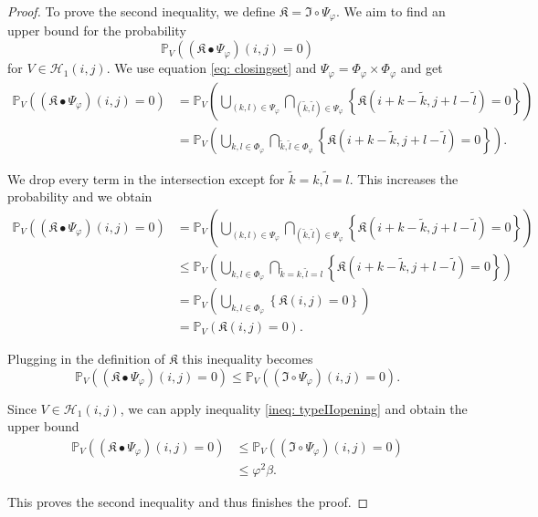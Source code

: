 \documentclass[a4paper,12pt]{article}
\theoremstyle{plain}
\theoremstyle{definition}
\begin{document}
\begin{proof}
	
	To prove the second inequality, we define $\mathfrak{K} = \mathfrak{I} \circ \Psi_\varphi$. We aim to find an upper bound for the probability
	\begin{equation*}
		\mathbb{P}_V\left( (\mathfrak{K} \bullet \Psi_\varphi)(i, j) = 0 \right)
	\end{equation*}
	for $V \in \mathcal{H}_1(i, j)$. We use equation \eqref{eq: closingset} and $\Psi_\varphi = \Phi_\varphi \times \Phi_\varphi$ and get
	\begin{align*}
		\mathbb{P}_V\left( (\mathfrak{K} \bullet \Psi_\varphi)(i, j) = 0 \right) &= \mathbb{P}_V\left( \bigcup_{(k, l) \in \Psi_\varphi} \bigcap_{(\tilde{k}, \tilde{l}) \in \Psi_\varphi} \left\{ \mathfrak{K}(i + k - \tilde{k}, j + l - \tilde{l}) = 0 \right\} \right) \\
		&= \mathbb{P}_V\left( \bigcup_{k, l \in \Phi_\varphi} \bigcap_{\tilde{k}, \tilde{l} \in \Phi_\varphi} \left\{ \mathfrak{K}(i + k - \tilde{k}, j + l - \tilde{l}) = 0 \right\} \right).
	\end{align*}
	
	We drop every term in the intersection except for $\tilde{k} = k, \tilde{l} = l$. This increases the probability and we obtain
	\begin{align*}
		\mathbb{P}_V\left( (\mathfrak{K} \bullet \Psi_\varphi)(i, j) = 0 \right) &= \mathbb{P}_V\left( \bigcup_{(k, l) \in \Psi_\varphi} \bigcap_{(\tilde{k}, \tilde{l}) \in \Psi_\varphi} \left\{ \mathfrak{K}(i + k - \tilde{k}, j + l - \tilde{l}) = 0 \right\} \right) \\
		&\leq \mathbb{P}_V\left( \bigcup_{k, l \in \Phi_\varphi} \bigcap_{\tilde{k} = k, \tilde{l} = l} \left\{ \mathfrak{K}(i + k - \tilde{k}, j + l - \tilde{l}) = 0 \right\} \right) \\
		&= \mathbb{P}_V\left( \bigcup_{k, l \in \Phi_\varphi} \left\{ \mathfrak{K}(i, j) = 0 \right\} \right) \\
		&= \mathbb{P}_V\left( \mathfrak{K}(i, j) = 0 \right).
	\end{align*}
	
	Plugging in the definition of $\mathfrak{K}$ this inequality becomes
	\begin{equation*}
		\mathbb{P}_V\left( (\mathfrak{K} \bullet \Psi_\varphi)(i, j) = 0 \right) \leq \mathbb{P}_V\left( (\mathfrak{I} \circ \Psi_\varphi)(i, j) = 0 \right).
	\end{equation*}
	
	Since $V \in \mathcal{H}_1(i, j)$, we can apply inequality \eqref{ineq: typeIIopening} and obtain the upper bound
	\begin{align*}
		\mathbb{P}_V\left( (\mathfrak{K} \bullet \Psi_\varphi)(i, j) = 0 \right) &\leq \mathbb{P}_V\left( (\mathfrak{I} \circ \Psi_\varphi)(i, j) = 0 \right) \\
		&\leq \varphi^2 \beta.
	\end{align*}
	
	This proves the second inequality and thus finishes the proof.
\end{proof}
\end{document}
